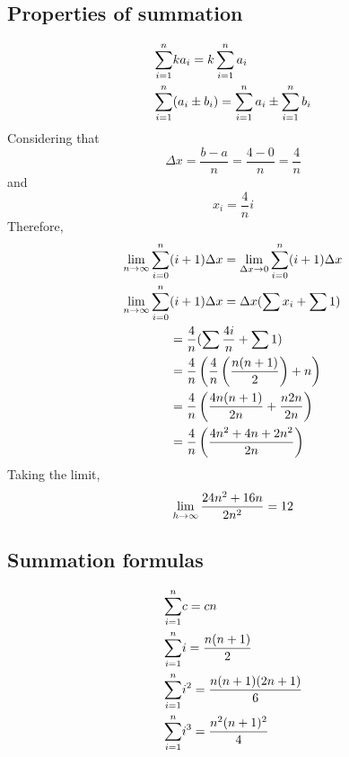 \documentclass[11pt]{article}
\newcommand*{\set}{\setcounter{equation}{0}}
\begin{document}
\subsection{Properties of summation}
\begin{align}
    \set
    \sum_{i=1}^{n}&ka_i=k\sum_{i=1}^{n}a_i\\
    \sum_{i=1}^{n}&(a_i\pm b_i)=\sum_{i=1}^{n}a_i\pm\sum_{i=1}^{n}b_i\\
\end{align}
Considering that
\[\Delta x=\frac{b-a}{n}=\frac{4-0}{n}=\frac{4}{n}\]
and
\[x_i=\frac{4}{n}i\]
Therefore,
\begin{align}
    \set
    \lim_{n\to\infty}\sum_{i=0}^{n}&(i+1)\Delta x=\lim_{\Delta x\to 0}\sum_{i=0}^{n}(i+1)\Delta x\\
    \lim_{n\to\infty}\sum_{i=0}^{n}&(i+1)\Delta x=\Delta x(\sum x_i+\sum 1)\\
    &=\frac{4}{n}(\sum \frac{4i}{n}+\sum 1)\\
    &=\frac{4}{n}\left(\frac{4}{n}\left(\frac{n(n+1)}{2}\right)+n\right)\\
    &=\frac{4}{n}\left(\frac{4n(n+1)}{2n}+\frac{n2n}{2n}\right)\\
    &=\frac{4}{n}\left(\frac{4n^2+4n+2n^2}{2n}\right)
\end{align}
Taking the limit,
\begin{align}
    \set
    \lim_{h\to\infty}\frac{24n^2+16n}{2n^2}
    =12
\end{align}
\subsection{Summation formulas}
\begin{align}
    \set
    \sum_{i=1}^{n}&c=cn\\
    \sum_{i=1}^{n}&i=\frac{n(n+1)}{2}\\
    \sum_{i=1}^{n}&i^2=\frac{n(n+1)(2n+1)}{6}\\
    \sum_{i=1}^{n}&i^3=\frac{n^2(n+1)^2}{4}
\end{align}
\end{document}
